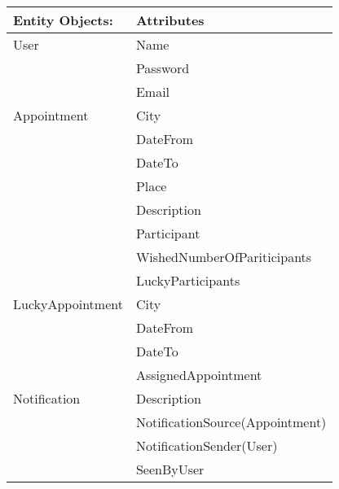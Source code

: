 {\tabulinesep=1.2mm
\begin{tabu}{ | p{3cm} | p{6cm} |}
    \hline
    \textbf{Entity Objects:}& 		\textbf{Attributes}  \\ \hline
    User 			        & 		Name          \\
                            &       Password       \\
                            &       Email         \\ \hline
    Appointment             &       City          \\
                            &       DateFrom      \\
                            &       DateTo        \\ 
                            &       Place         \\ 
                            &       Description         \\ 
                            &       Participant         \\ 
                            &       WishedNumberOfPariticipants         \\ 
                            &       LuckyParticipants \\\hline 
    LuckyAppointment        &       City          \\
                            &       DateFrom      \\
                            &       DateTo        \\ 
                            &       AssignedAppointment\\\hline
    Notification            &       Description\\
                            &       NotificationSource(Appointment)\\
                            &       NotificationSender(User)\\
                            &       SeenByUser\\\hline
\end{tabu}
}
